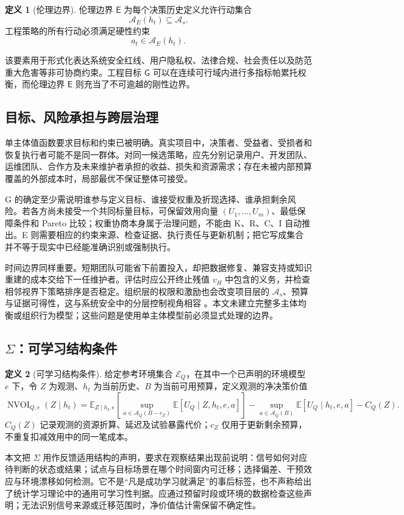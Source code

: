 \documentclass[11pt,a4paper]{ctexart}
\numberwithin{equation}{section}
\theoremstyle{definition}
\newtheorem{definition}{定义}[section]
\theoremstyle{plain}
\newcommand{\Goal}{\mathsf{G}}
\newcommand{\Eth}{\mathsf{E}}
\begin{document}
\begin{definition}[伦理边界]
伦理边界 $\Eth$ 为每个决策历史定义允许行动集合
\[
\mathcal{A}_E(h_t)\subseteq\mathcal{A}_s.
\]
工程策略的所有行动必须满足硬性约束
\[
a_t\in\mathcal{A}_E(h_t).
\]
\end{definition}

该要素用于形式化表达系统安全红线、用户隐私权、法律合规、社会责任以及防范重大危害等非可协商约束。工程目标 $\Goal$ 可以在连续可行域内进行多指标帕累托权衡，而伦理边界 $\Eth$ 则充当了不可逾越的刚性边界。


\subsection{目标、风险承担与跨层治理}

单主体值函数要求目标和约束已被明确。真实项目中，决策者、受益者、受损者和恢复执行者可能不是同一群体。对同一候选策略，应先分别记录用户、开发团队、运维团队、合作方及未来维护者承担的收益、损失和资源需求；存在未被内部预算覆盖的外部成本时，局部最优不保证整体可接受。

G 的确定至少需说明谁参与定义目标、谁接受权重及折现选择、谁承担剩余风险。若各方尚未接受一个共同标量目标，可保留效用向量 $(U_1,\ldots,U_m)$、最低保障条件和 Pareto 比较；权重协商本身属于治理问题，不能由 K、R、C、I 自动推出。E 则需要相应的约束来源、检查证据、执行责任与更新机制；把它写成集合并不等于现实中已经能准确识别或强制执行。

时间边界同样重要。短期团队可能省下前置投入，却把数据修复、兼容支持或知识重建的成本交给下一任维护者。评估时应公开终止残值 $v_H$ 中包含的义务，并检查相邻视界下策略排序是否稳定。组织层的权限和激励也会改变项目层的 $\mathcal A_s$、预算与证据可得性，这与系统安全中的分层控制视角相容 \cite{leveson2004}。本文未建立完整多主体均衡或组织行为模型；这些问题是使用单主体模型前必须显式处理的边界。

\subsection{\texorpdfstring{$\Sigma$}{Sigma}：可学习结构条件}

\begin{definition}[可学习结构条件]
给定参考环境集合 $\mathcal E_Q$，在其中一个已声明的环境模型 $e$ 下，令 $Z$ 为观测、$h_t$ 为当前历史、$B$ 为当前可用预算，定义观测的净决策价值
\begin{equation}
\operatorname{NVOI}_{Q,e}(Z\mid h_t)
=
\mathbb E_{Z\mid h_t,e}
\left[
\sup_{a\in\mathcal A_Q(B-c_Z)}
\mathbb E[U_Q\mid Z,h_t,e,a]
\right]
-
\sup_{a\in\mathcal A_Q(B)}
\mathbb E[U_Q\mid h_t,e,a]
-
C_Q(Z).
\label{eq:nvoi}
\end{equation}
$C_Q(Z)$ 记录观测的资源折算、延迟及试验暴露代价；$c_Z$ 仅用于更新剩余预算，不重复扣减效用中的同一笔成本。

本文把 $\Sigma$ 用作反馈适用结构的声明，要求在观察结果出现前说明：信号如何对应待判断的状态或结果；试点与目标场景在哪个时间窗内可迁移；选择偏差、干预效应与环境漂移如何检测。它不是“凡是成功学习就满足”的事后标签，也不声称给出了统计学习理论中的通用可学习性判据。应通过预留时段或环境的数据检查这些声明；无法识别信号来源或迁移范围时，净价值估计需保留不确定性。
\end{definition}
\end{document}
